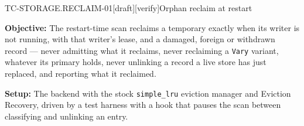 \begin{requirement}{TC-STORAGE.RECLAIM-01}[draft][verify]{Orphan reclaim at restart}


  \textbf{Objective:} The restart-time scan reclaims a temporary exactly when
  its writer is not running, with that writer's lease, and a damaged, foreign
  or withdrawn record --- never admitting what it reclaims, never reclaiming a
  \texttt{Vary} variant, whatever its primary holds, never unlinking a record
  a live store has just replaced, and reporting what it reclaimed.

  \textbf{Setup:} The backend with the stock \texttt{simple\_lru} eviction
  manager and Eviction Recovery, driven by a test harness with a hook that
  pauses the scan between classifying and unlinking an entry.


\end{requirement}
